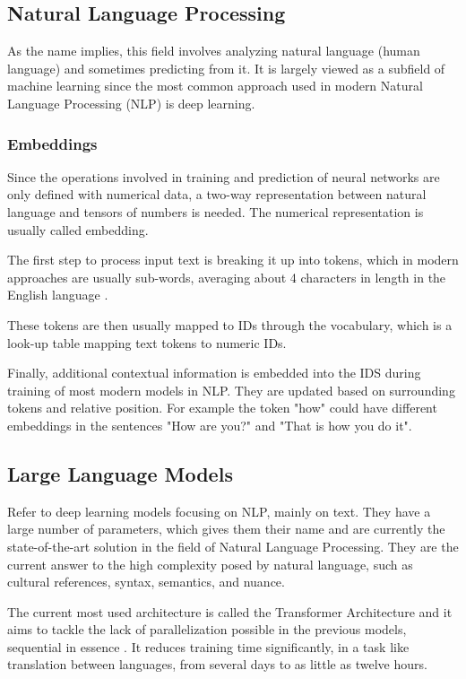 \subsection{Natural Language Processing}

As the name implies, this field involves analyzing natural language (human language) and sometimes predicting from it. It is largely viewed as a subfield of machine learning since the most common approach used in modern Natural Language Processing (NLP) is deep learning.

\subsubsection{Embeddings}
Since the operations involved in training and prediction of neural networks are only defined with numerical data, a two-way representation between natural language and tensors of numbers is needed. The numerical representation is usually called embedding.

The first step to process input text is breaking it up into tokens, which in modern approaches are usually sub-words, averaging about 4 characters in length in the English language \cite{OpenAITokens}.

These tokens are then usually mapped to IDs through the vocabulary, which is a look-up table mapping text tokens to numeric IDs.

Finally, additional contextual information is embedded into the IDS during training of most modern models in NLP. They are updated based on surrounding tokens and relative position. For example the token "how" could have different embeddings in the sentences "How are you?" and "That is how you do it".

\subsection{Large Language Models}

Refer to deep learning models focusing on NLP, mainly on text. They have a large number of parameters, which gives them their name and are currently the state-of-the-art solution in the field of Natural Language Processing. They are the current answer to the high complexity posed by natural language, such as cultural references, syntax, semantics, and nuance.

The current most used architecture is called the Transformer Architecture and it aims to tackle the lack of parallelization possible in the previous models, sequential in essence \cite{vaswani2017attention}. It reduces training time significantly, in a task like translation between languages, from several days \cite{bahdanau2014neural} to as little as twelve hours.


